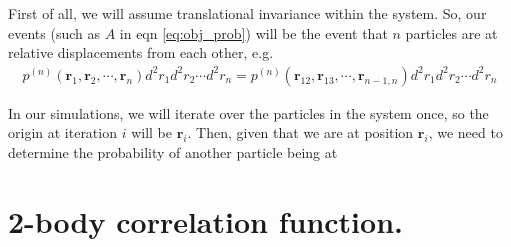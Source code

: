 \documentclass[twocolumn,amsmath,amssymb,aps]{revtex4-1}%
\begin{document}
First of all, we will assume translational invariance within the system.
So, our events (such as $A$ in eqn \ref{eq:obj_prob}) will be the event
that $n$ particles are at relative displacements from each other, e.g.
\begin{align}
  p^(n)(\bm{r}_1,\bm{r}_2,\cdots,\bm{r}_n)d^2r_1d^2r_2\cdots d^2r_n
  = p^(n)(\bm{r}_{12},\bm{r}_{13},\cdots,\bm{r}_{n-1,n})d^2r_1d^2r_2
  \cdots d^2r_n
\end{align}

In our simulations, we will iterate over the particles in the system once,
so the origin at iteration $i$ will be $\bm{r}_i$. Then, given that we are
at position $\bm{r}_i$, we need to determine the probability of another
particle being at 

\section{2-body correlation function.}




\end{document}
